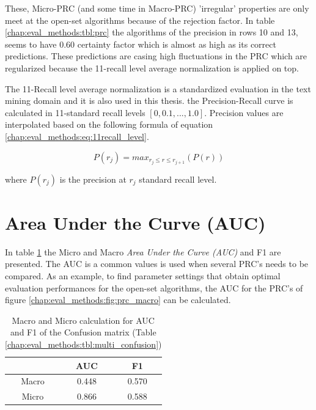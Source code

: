 These, Micro-PRC (and some time in Macro-PRC) 'irregular' properties are only meet at the open-set algorithms because of the rejection factor. In table \ref{chap:eval_methods:tbl:prc} the algorithms of the precision in rows 10 and 13, seems to have $0.60$ certainty factor which is almost as high as its correct predictions. These predictions are casing high fluctuations in the PRC which are regularized because the 11-recall level average normalization is applied on top. 

The 11-Recall level average normalization is a standardized evaluation in the text mining domain and it is also used in this thesis. the Precision-Recall curve is calculated in 11-standard recall levels $[0,0.1,...,1.0]$. Precision values are interpolated based on the following formula of equation \ref{chap:eval_methods:eq:11recall_level}.

\begin{equation}\label{chap:eval_methods:eq:11recall_level}
	P(r_j)=max_{r_j \leqslant r \leqslant r_{j+1}}(P(r))
\end{equation}

\noindent
where $P(r_j)$ is the precision at $r_j$ standard recall level.


\section{Area Under the Curve (AUC)}\label{chap:eval_methods:sec:closed_set_classification} 

In table \ref{chap:eval_methods:tbl:AUC_F1} the Micro and Macro \textit{Area Under the Curve (AUC)} and F1 are presented. The AUC is a common values is used when several PRC's needs to be compared. As an example, to find parameter settings that obtain optimal evaluation performances for the open-set algorithms, the AUC for the PRC's of figure \ref{chap:eval_methods:fig:prc_macro} can be calculated. 


\begin{table}[H]
	\center
	\caption{Macro and Micro calculation for AUC and F1 of the Confusion matrix (Table \ref{chap:eval_methods:tbl:multi_confusion})}\label{chap:eval_methods:tbl:AUC_F1}
	\begin{tabular}{c|c|c|}
		\cline{2-3}
		& AUC & F1 \\
		\hline
		\multicolumn{1}{|c|}{Macro} & 0.448 & 0.570 \\
		\multicolumn{1}{|c|}{Micro} & 0.866 & 0.588 \\	
		\hline
	\end{tabular}
\end{table}

